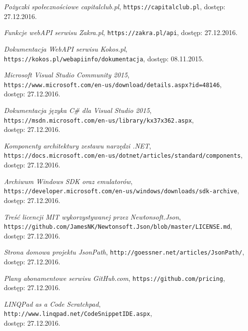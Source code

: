 \documentclass[a4paper,twoside,titlepage,openright]{book}
\begin{document}
\begin{thebibliography}{99}
 \textit{Pożyczki społecznościowe capitalclub.pl}, 
\texttt{https://capitalclub.pl}, dostęp: 27.12.2016.

 \textit{Funkcje webAPI serwisu Zakra.pl}, 
\texttt{https://zakra.pl/api}, dostęp: 27.12.2016.

 \textit{Dokumentacja WebAPI serwisu Kokos.pl}, 
\texttt{https://kokos.pl/webapiinfo/dokumentacja}, dostęp: 08.11.2015.

 \textit{Microsoft Visual Studio Community 2015}, \\
\texttt{https://www.microsoft.com/en-us/download/details.aspx?id=48146}, \\dostęp: 27.12.2016.

 \textit{Dokumentacja języka C\# dla Visual Studio 2015}, \\
\texttt{https://msdn.microsoft.com/en-us/library/kx37x362.aspx}, \\dostęp: 27.12.2016.

 \textit{Komponenty architektury zestawu narzędzi .NET}, \\
\texttt{https://docs.microsoft.com/en-us/dotnet/articles/standard/components},\\ dostęp: 27.12.2016.

 \textit{Archiwum Windows SDK oraz emulatorów}, \\
\texttt{https://developer.microsoft.com/en-us/windows/downloads/sdk-archive}, \\dostęp: 27.12.2016.

 \textit{Treść licencji MIT wykorzystywanej przez Newtonsoft.Json}, \\
\texttt{https://github.com/JamesNK/Newtonsoft.Json/blob/master/LICENSE.md}, \\dostęp: 27.12.2016.

 \textit{Strona domowa projektu JsonPath}, 
\texttt{http://goessner.net/articles/JsonPath/}, \\dostęp: 27.12.2016.

 \textit{Plany abonamentowe serwisu GitHub.com}, 
\texttt{https://github.com/pricing}, \\dostęp: 27.12.2016.

 \textit{LINQPad as a Code Scratchpad}, 
\texttt{http://www.linqpad.net/CodeSnippetIDE.aspx}, \\dostęp: 27.12.2016.


\end{thebibliography}
\end{document}
